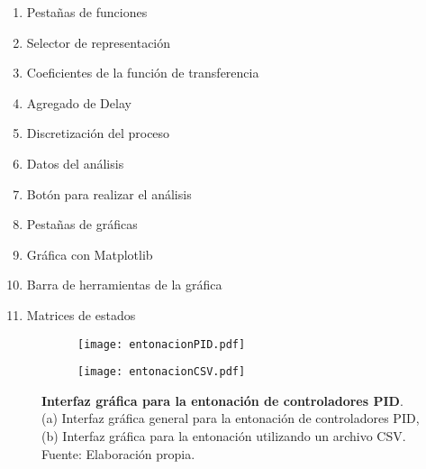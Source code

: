     \begin{multicols}{2}
        \begin{enumerate}[leftmargin=20pt]
            \item Pestañas de funciones
            \item Selector de representación
            \item Coeficientes de la función de transferencia
            \item Agregado de Delay
            \item Discretización del proceso
            \item Datos del análisis
            \item Botón para realizar el análisis
            \item Pestañas de gráficas
            \item Gráfica con Matplotlib
            \item Barra de herramientas de la gráfica
            \item Matrices de estados
        \end{enumerate}
    \end{multicols}

    \begin{figure}[h!]
        \centering
        \begin{subfigure}[t]{\textwidth}
            \centering
            \texttt{[image: entonacionPID.pdf]}
            \caption{}
            \label{fig:interfazentonacionPID}
        \end{subfigure}
        \hfill
        \begin{subfigure}[t]{\textwidth}
            \centering
            \texttt{[image: entonacionCSV.pdf]}
            \caption{}
            \label{fig:interfazentonacionCSV}
        \end{subfigure}
        \caption[Interfaz gráfica para la entonación de controladores PID]{\textbf{Interfaz gráfica para la entonación de controladores PID}. (a) Interfaz gráfica general para la entonación de controladores PID, (b) Interfaz gráfica para la entonación utilizando un archivo CSV. Fuente: Elaboración propia. \label{fig:interfazentonacion}}
    \end{figure}

